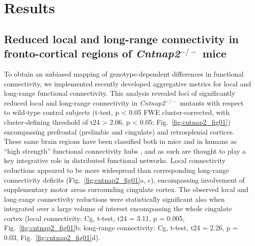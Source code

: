 \section{Results}

\subsection{Reduced local and long-range connectivity in fronto-cortical regions
of \textit{Cntnap2}$^{-/-}$ mice}

To obtain an unbiased mapping of genotype-dependent differences in functional
connectivity, we implemented recently developed aggregative metrics for local
and long-range functional connectivity. This analysis revealed foci of
significantly reduced local and long-range connectivity in \textit{Cntnap2}$^{-/-}$ mutants
with respect to wild-type control subjects (t-test, p < 0.05 FWE
cluster-corrected, with cluster-defining threshold of t24 > 2.06, p < 0.05;
Fig.~\ref{fig:cntnap2_fig01}) encompassing prefrontal (prelimbic and cingulate)
and retrosplenial cortices.  These same brain regions have been classified both
in mice and in humans as “high strength” functional connectivity hubs
\parencite{buckner2009, cole2010, liska2015}, and as such are thought to play a
key integrative role in distributed functional networks. Local connectivity
reductions appeared to be more widespread than corresponding long-range
connectivity deficits (Fig.~\ref{fig:cntnap2_fig01}a, c), encompassing
involvement of supplementary motor areas surrounding cingulate cortex. The
observed local and long-range connectivity reductions were statistically
significant also when integrated over a large volume of interest encompassing
the whole cingulate cortex (local connectivity: Cg, t-test, t24 = 3.11, p =
0.005, Fig.~\ref{fig:cntnap2_fig01}b; long-range connectivity: Cg, t-test, t24 =
2.26, p = 0.03, Fig.~\ref{fig:cntnap2_fig01}d). 

